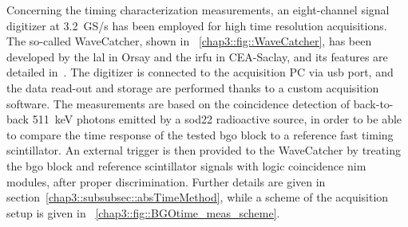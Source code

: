 Concerning the timing characterization measurements, an eight-channel signal digitizer at 3.2~GS/s has been employed for high time resolution acquisitions. The so-called WaveCatcher, shown in \figurename~\ref{chap3::fig::WaveCatcher}, has been developed by the \gls{lal} in Orsay and the \gls{irfu} in CEA-Saclay, and its features are detailed in~\cite{Breton2014}. The digitizer is connected to the acquisition PC via \gls{usb} port, and the data read-out and storage are performed thanks to a custom acquisition software.  The measurements are based on the coincidence detection of back-to-back 511~keV photons emitted by a \gls{sod22} radioactive source, in order to be able to compare the time response of the tested \gls{bgo} block to a reference fast timing scintillator. An external trigger is then provided to the WaveCatcher by treating the \gls{bgo} block and reference scintillator signals with logic coincidence \gls{nim} modules, after proper discrimination. Further details are given in section~\ref{chap3::subsubsec::absTimeMethod}, while a scheme of the acquisition setup is given in \figurename~\ref{chap3::fig::BGOtime_meas_scheme}.

